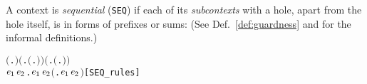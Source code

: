 A context is \emph{sequential} (\texttt{SEQ}) if each of its \emph{subcontexts} with
a hole, apart from the hole itself, is in forms of prefixes or sums:
(See Def.~\ref{def:guardness} and \citep[p.~101, 157]{Mil89} for
the informal definitions.)
 \begin{alltt}
\HOLTokenTurnstile{}  \ensuremath{(}\HOLTokenLambda{}. \ensuremath{)} \HOLSymConst{\HOLTokenConj{}} \ensuremath{(}\HOLSymConst{\HOLTokenForall{}}.  \ensuremath{(}\HOLTokenLambda{}. \ensuremath{)}\ensuremath{)} \HOLSymConst{\HOLTokenConj{}} \ensuremath{(}\HOLSymConst{\HOLTokenForall{}} .   \HOLSymConst{\HOLTokenImp{}}  \ensuremath{(}\HOLTokenLambda{}. \HOLSymConst{\ensuremath{\ldotp}} \ensuremath{)}\ensuremath{)} \HOLSymConst{\HOLTokenConj{}}
   \HOLSymConst{\HOLTokenForall{}}\ensuremath{\HOLBoundVar{e}\sb{\mathrm{1}}} \ensuremath{\HOLBoundVar{e}\sb{\mathrm{2}}}.  \ensuremath{\HOLBoundVar{e}\sb{\mathrm{1}}} \HOLSymConst{\HOLTokenConj{}}  \ensuremath{\HOLBoundVar{e}\sb{\mathrm{2}}} \HOLSymConst{\HOLTokenImp{}}  \ensuremath{(}\HOLTokenLambda{}. \ensuremath{\HOLBoundVar{e}\sb{\mathrm{1}}}  \HOLSymConst{\ensuremath{+}} \ensuremath{\HOLBoundVar{e}\sb{\mathrm{2}}} \ensuremath{)}\hfill{[SEQ_rules]}
\end{alltt}

